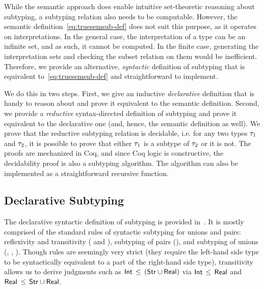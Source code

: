 While the semantic approach does enable intuitive set-theo\-re\-tic
reasoning about subtyping,
a subtyping relation also needs to be computable.
However, the semantic definition~\eqref{eq:truesemsub-def}
does not suit this purpose,
as it operates on interpretations.
In the general case, the interpretation of a type 
can be an infinite set, and as such, it cannot be computed.
In the finite case, generating the interpretation sets
and checking the subset relation on them would be inefficient.
Therefore, we provide an alternative, \emph{syntactic} definition of subtyping 
that is equivalent to~\eqref{eq:truesemsub-def}
and straightforward to implement.

We do this in two steps. 
First, we give an inductive \emph{declarative} definition
that is handy to reason about 
and prove it equivalent to the semantic definition.
Second, we provide a \emph{reductive} syntax-directed definition of subtyping
and prove it equivalent to the declarative one 
(and, hence, the semantic definition as well).
We prove that the reductive subtyping relation is decidable, 
i.e. for any two types $\tau_1$ and $\tau_2$,
it is possible to prove that either $\tau_1$ is a subtype of $\tau_2$ 
or it is not.
The proofs are mechanized in Coq, and since Coq logic is constructive,
the decidability proof is also a subtyping algorithm.
The algorithm can also be implemented as a straightforward recursive function.

\subsection{Declarative Subtyping}\label{sec:declsub}

The declarative syntactic definition of subtyping is provided in~.
It is mostly comprised of the standard rules
of syntactic subtyping for unions and pairs:
reflexivity and transitivity ( and ), 
subtyping of pairs (),
and subtyping of unions (, , ).
Though  rules are seemingly very strict 
(they require the left-hand side type to be syntactically equivalent
to a part of the right-hand side type), 
transitivity allows us to derive judgments such as
$\mathsf{Int} \, \leq \, (\mathsf{Str} \cup \mathsf{Real})$ via
$\mathsf{Int} \, \leq \, \mathsf{Real}$ and $\mathsf{Real} \, \leq \, \mathsf{Str} \cup \mathsf{Real}$.

